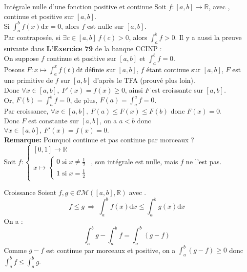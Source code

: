 \documentclass[11pt]{article}
\newcommand*{\R}{\mathbb{R}}
\newcommand*{\CM}{\mathcal{CM}}
\newcommand{\0}{\varnothing}
\newcommand*{\n}{\\[0.2cm]}
\newcommand{\dx}{\textrm{d}x}
\newcommand{\dt}{\textrm{d}t}
\begin{document}
\begin{prop}{Intégrale nulle d'une fonction positive et continue}{}
    Soit $f:[a,b]\to\R$, avec , continue et positive sur $[a,b]$.\\
    Si $\int_a^bf(x)\dx=0$, alors $f$ est nulle sur $[a,b]$.\\
    Par contraposée, si $\exists c \in [a,b] ~ f(c)>0$, alors $\int_a^bf>0$.
    \tcblower
    Il y a aussi la preuve suivante dans \textbf{L'Exercice 79} de la banque CCINP :\\
    On suppose $f$ continue et positive sur $[a,b]$ et $\int_a^bf=0$.\\
    Posons $F:x\mapsto\int_a^xf(t)\dt$ définie sur $[a,b]$, $f$ étant continue sur $[a,b]$, $F$ est une primitive de $f$ sur $[a,b]$ d'après le TFA (prouvé plus loin).\\
    Donc $\forall x \in [a,b], ~ F'(x)=f(x)\geq0$, ainsi $F$ est croissante sur $[a,b]$.\\
    Or, $F(b)=\int_a^bf=0$, de plus, $F(a)=\int_a^af=0$.\\
    Par croissance, $\forall x \in [a,b], ~ F(a) \leq F(x)\leq F(b)$ donc $F(x)=0$.\\
    Donc $F$ est constante sur $[a,b]$, on a $a<b$ donc $\forall x\in[a,b], ~ F'(x)=f(x)=0$.
    \n\textbf{Remarque:} Pourquoi continue et pas continue par morceaux ?\\
    Soit $f:\begin{cases}[0,1]\to\R\\x\mapsto\begin{cases}0 \text{ si } x\neq\frac{1}{2}\\1 \text{ si } x=\frac{1}{2}\end{cases}\end{cases}$, son intégrale est nulle, mais $f$ ne l'est pas.
\end{prop}

\begin{prop}{Croissance}{}
    Soient $f,g\in\CM([a,b],\R)$ avec .
    \begin{equation*}
        f \leq g ~ \Longrightarrow ~ \int_a^bf(x)\dx \leq \int_a^b g(x)\dx
    \end{equation*}
    \tcblower
    On a :
    \begin{equation*}
        \int_a^b g - \int_a^b f = \int_a^b(g-f)
    \end{equation*}
    Comme $g-f$ est continue par morceaux et positive, on a $\int_a^b(g-f)\geq0$ donc $\int_a^bf\leq\int_a^bg$.
\end{prop}
\end{document}
